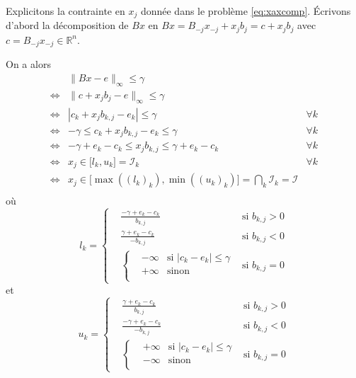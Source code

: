 \documentclass[12pt,a4paper]{reedthesis}
\newcommand \RR {\mathbb{R}}
\theoremstyle{definition}
\theoremstyle{definition}
\theoremstyle{definition}
\theoremstyle{remark}
\begin{document}
Explicitons la contrainte en \(x_j\) donnée dans le problème \eqref{eq:xaxcomp}. Écrivons d'abord la décomposition de \(Bx\) en \(Bx = B_{-j}x_{-j} + x_jb_j = c + x_jb_j\) avec \(c = B_{-j}x_{-j}\in\RR^n\).

On a alors
\begin{equation*}
\begin{aligned}
& \|Bx - e\|_\infty \leq \gamma \\
\iff  & \|c + x_jb_j - e\|_\infty \leq \gamma \\
\iff  & |c_k + x_jb_{k,j} - e_k| \leq \gamma & \forall k \\
\iff  & -\gamma \leq c_k + x_jb_{k,j} - e_k \leq \gamma & \forall k \\
\iff  & -\gamma + e_k - c_k \leq x_jb_{k,j} \leq \gamma + e_k - c_k  & \forall k\\
\iff  & x_j \in \mathopen[l_k, u_k\mathclose] = \mathcal{I}_k & \forall k\\
\iff  & x_j \in \mathopen[\max((l_k)_k) , \min((u_k)_k)\mathclose] = \bigcap_k \mathcal{I}_k = \mathcal{I} \\
\end{aligned}
\end{equation*}
où
\begin{equation*}
l_k = \left\{
  \begin{aligned}
    & \frac{-\gamma + e_k - c_k}{b_{k,j}} & \text{si } b_{k,j} > 0 \\
    & \frac{\gamma + e_k - c_k}{-b_{k,j}} & \text{si } b_{k,j} < 0 \\
    & \left\{  
    \begin{aligned}
      & -\infty & \text{si }|c_k - e_k| \leq \gamma \\
      & +\infty & \text{sinon} \\
    \end{aligned}
    \right. & \text{si } b_{k,j} = 0
  \end{aligned}
\right.
\end{equation*}
et
\begin{equation*}
u_k = \left\{
  \begin{aligned}
      & \frac{\gamma + e_k - c_k}{b_{k,j}} & \text{si } b_{k,j} > 0 \\
      & \frac{-\gamma + e_k - c_k}{-b_{k,j}} & \text{si } b_{k,j} < 0 \\
    & \left\{  
    \begin{aligned}
      & +\infty & \text{si }|c_k - e_k| \leq \gamma \\
      & -\infty & \text{sinon} \\
    \end{aligned}
    \right. & \text{si } b_{k,j} = 0
  \end{aligned}
\right.
\end{equation*}
\end{document}
